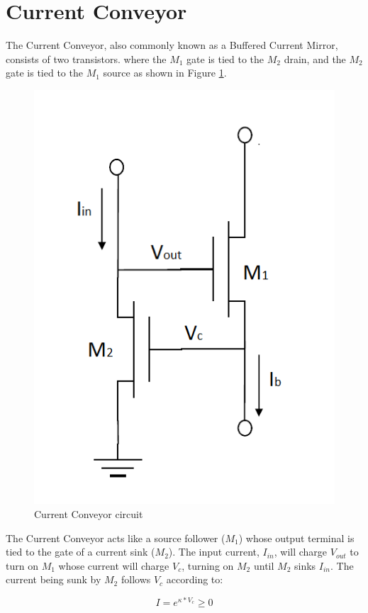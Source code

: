 \documentclass[main]{subfiles}
\begin{document}

\section{Current Conveyor}
The Current Conveyor, also commonly known as a Buffered Current Mirror, consists of two transistors. where the $M_1$ gate is tied to the $M_2$ drain, and the $M_2$ gate is tied to the $M_1$ source as shown in Figure \ref{fig:Current_Conveyor_circuit}.

\begin{figure}[htbp]
  \centering
  \includegraphics[scale=0.5]{figs/Current_Conveyor_circuit.png}
  \caption{Current Conveyor circuit}
  \label{fig:Current_Conveyor_circuit}
\end{figure}
The Current Conveyor acts like a source follower ($M_1$) whose output terminal is tied to the gate of a current sink ($M_2$). The input current, $I_{in}$, will charge $V_{out}$ to turn on $M_1$ whose current will charge $V_c$, turning on $M_2$ until $M_2$ sinks $I_{in}$. The current being sunk by $M_2$ follows $V_c$ according to:

\begin{equation}
I =  e^{\kappa*V_c} \geq 0
\end{equation}  
\end{document}

